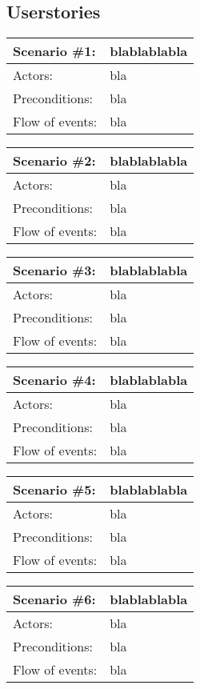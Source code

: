 \subsection{Userstories}

\begin{tabular}{| l | l |}
	\hline
	Scenario \#1: & blablablabla \\ \hline
	Actors: & bla \\ \hline
	Preconditions: & bla \\ \hline
	Flow of events: & bla \\ \hline
\end{tabular}

\begin{tabular}{| l | l |}
	\hline
	Scenario \#2: & blablablabla \\ \hline
	Actors: & bla \\ \hline
	Preconditions: & bla \\ \hline
	Flow of events: & bla \\ \hline
\end{tabular}

\begin{tabular}{| l | l |}
	\hline
	Scenario \#3: & blablablabla \\ \hline
	Actors: & bla \\ \hline
	Preconditions: & bla \\ \hline
	Flow of events: & bla \\ \hline
\end{tabular}

\begin{tabular}{| l | l |}
	\hline
	Scenario \#4: & blablablabla \\ \hline
	Actors: & bla \\ \hline
	Preconditions: & bla \\ \hline
	Flow of events: & bla \\ \hline
\end{tabular}

\begin{tabular}{| l | l |}
	\hline
	Scenario \#5: & blablablabla \\ \hline
	Actors: & bla \\ \hline
	Preconditions: & bla \\ \hline
	Flow of events: & bla \\ \hline
\end{tabular}

\begin{tabular}{| l | l |}
	\hline
	Scenario \#6: & blablablabla \\ \hline
	Actors: & bla \\ \hline
	Preconditions: & bla \\ \hline
	Flow of events: & bla \\ \hline
\end{tabular}

